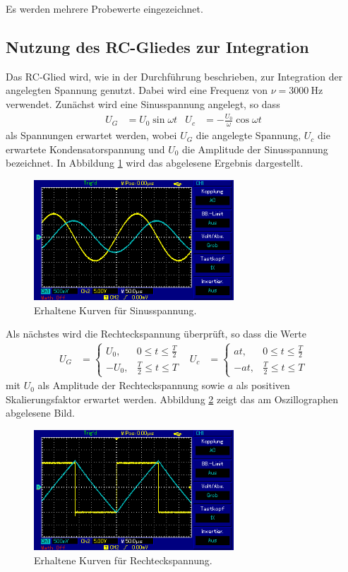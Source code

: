 Es werden mehrere Probewerte eingezeichnet.

\subsection{Nutzung des RC-Gliedes zur Integration}
Das RC-Glied wird, wie in der Durchführung beschrieben, zur Integration der angelegten Spannung genutzt.
Dabei wird eine Frequenz von $\nu = \SI{3000}{\hertz}$ verwendet.
Zunächst wird eine Sinusspannung angelegt, so dass
\begin{align}
U_G &= U_0\sin{\omega t}  & U_c &= -\frac{U_0}{\omega}\cos{\omega t}
\end{align}
als Spannungen erwartet werden, wobei $U_G$ die angelegte Spannung, $U_c$ die erwartete Kondensatorspannung und $U_0$ die Amplitude der Sinusspannung bezeichnet.
In Abbildung \ref{fig:sin_r} wird das abgelesene Ergebnis dargestellt.

\begin{figure}[H]
  \centering
  \includegraphics[height=4.5cm]{oz5.png}
  \caption{Erhaltene Kurven für Sinusspannung.}
  \label{fig:sin_r}
\end{figure}


Als nächstes wird die Rechteckspannung überprüft, so dass die Werte
\begin{align}
  U_G &=
  \begin{cases}
    U_0 , &  0 \leq t \leq \frac{T}{2} \\
    -U_0 , & \frac{T}{2} \leq t \leq T
  \end{cases}
   & U_c &=
  \begin{cases}
    at , &  0 \leq t \leq \frac{T}{2} \\
    -at , & \frac{T}{2} \leq t \leq T
  \end{cases}
\end{align}
mit $U_0$ als Amplitude der Rechteckspannung sowie $a$ als positiven Skalierungsfaktor erwartet werden.
Abbildung \ref{fig:rechteck_s} zeigt das am Oszillographen abgelesene Bild.

\begin{figure}[H]
  \centering
  \includegraphics[height=4.5cm]{oz7.png}
  \caption{Erhaltene Kurven für Rechteckspannung.}
  \label{fig:rechteck_s}
\end{figure}

